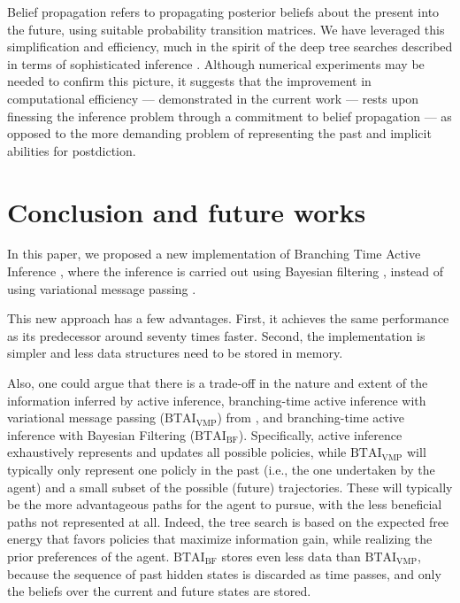 \documentclass[twoside,11pt]{article}
\begin{document}
Belief propagation refers to propagating posterior beliefs about the present into the future, using suitable probability transition matrices. We have leveraged this simplification and efficiency, much in the spirit of the deep tree searches described in terms of sophisticated inference \citep{sophisticated}. Although numerical experiments may be needed to confirm this picture, it suggests that the improvement in computational efficiency --- demonstrated in the current work --- rests upon finessing the inference problem through a commitment to belief propagation --- as opposed to the more demanding problem of representing the past and implicit abilities for postdiction.

\section{Conclusion and future works} \label{sec:conclusion}

In this paper, we proposed a new implementation of Branching Time Active Inference \citep{AITS_THEORY,AITS_PRACTICE}, where the inference is carried out using Bayesian filtering \citep{BAYESIAN_FILTERING}, instead of using variational message passing \citep{AI_VMP,VMP_TUTO}.

This new approach has a few advantages. First, it achieves the same performance as its predecessor around seventy times faster. Second, the implementation is simpler and less data structures need to be stored in memory.

Also, one could argue that there is a trade-off in the nature and extent of the information inferred by active inference, branching-time active inference with variational message passing ($\text{BTAI}_{\text{VMP}}$) from \citet{AITS_THEORY,AITS_PRACTICE}, and branching-time active inference with Bayesian Filtering ($\text{BTAI}_{\text{BF}}$). Specifically, active inference exhaustively represents and updates all possible policies, while $\text{BTAI}_{\text{VMP}}$ will typically only represent one policly in the past (i.e., the one undertaken by the agent) and a small subset of the possible (future) trajectories. These will typically be the more advantageous paths for the agent to pursue, with the less beneficial paths not represented at all. Indeed, the tree search is based on the expected free energy that favors policies that maximize information gain, while realizing the prior preferences of the agent. $\text{BTAI}_{\text{BF}}$ stores even less data than $\text{BTAI}_{\text{VMP}}$, because the sequence of past hidden states is discarded as time passes, and only the beliefs over the current and future states are stored.
\end{document}

